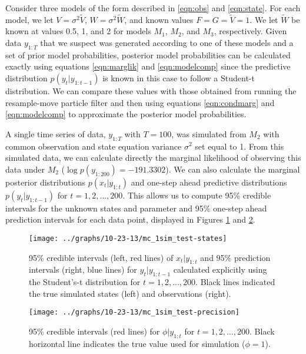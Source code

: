\documentclass{article}
\begin{document}
Consider three models of the form described in \eqref{eqn:obs} and \eqref{eqn:state}. For each model, we let $V = \sigma^2\tilde{V}$, $W = \sigma^2\tilde{W}$, and known values $F = G = \tilde{V} = 1$. We let $\tilde{W}$ be known at values 0.5, 1, and 2 for models $M_1$, $M_2$, and $M_3$, respectively. Given data $y_{1:T}$ that we suspect was generated according to one of these models and a set of prior model probabilities, posterior model probabilities can be calculated exactly using equations \eqref{eqn:marglik} and \eqref{eqn:modelcomp} since the predictive distribution $p(y_t|y_{1:t-1})$ is known in this case to follow a Student-t distribution. We can compare these values with those obtained from running the resample-move particle filter and then using equations \eqref{eqn:condmarg} and \eqref{eqn:modelcomp} to approximate the posterior model probabilities.

A single time series of data, $y_{1:T}$ with $T = 100$, was simulated from $M_2$ with common observation and state equation variance $\sigma^2$ set equal to 1. From this simulated data, we can calculate directly the marginal likelihood of observing this data under $M_2$ ($\log p(y_{1:200}) = -191.3302$). We can also calculate the marginal posterior distributions $p(x_t|y_{1:t})$ and one-step ahead predictive distributions $p(y_t|y_{1:t-1})$ for $t = 1,2,\ldots,200$. This allows us to compute 95\% credible intervals for the unknown states and parameter and 95\% one-step ahead prediction intervals for each data point, displayed in Figures \ref{fig:sim-states} and \ref{fig:sim-precision}.

\begin{figure}
\texttt{[image: ../graphs/10-23-13/mc\_1sim\_test-states]}
\caption{95\% credible intervals (left, red lines) of $x_t|y_{1:t}$ and 95\% prediction intervals (right, blue lines) for $y_t|y_{1:t-1}$ calculated explicitly using the Student's-t distribution for $t = 1,2,\ldots,200$. Black lines indicated the true simulated states (left) and observations (right).} \label{fig:sim-states}
\end{figure}

\begin{figure}
\texttt{[image: ../graphs/10-23-13/mc\_1sim\_test-precision]}
\caption{95\% credible intervals (red lines) for $\phi|y_{1:t}$ for $t = 1, 2, \ldots, 200$. Black horizontal line indicates the true value used for simulation ($\phi = 1$).} \label{fig:sim-precision}
\end{figure}
\end{document}

